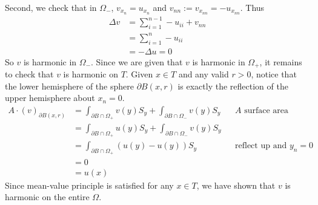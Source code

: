 \documentclass[12pt]{article}
\begin{document}
\begin{problem}[3]
\begin{problem}[5]
Second, we check that in $ \Omega_{-}$, $ v_{x_n} = u_{x_n}$ and $v_{nn}:= v_{x_{nn}} = -u_{x_{nn}}$. Thus
\begin{align*}
	\Delta v &= \sum_{ i= 1}^{ n-1} -u_{ii} + v_{nn} \\
	&= \sum_{ i= 1}^{ n} -u_{ii} \\
	&= - \Delta u = 0
\end{align*}
So $ v$ is harmonic in  $ \Omega_{-}$. Since we are given that $ v$ is harmonic in $ \Omega_{+}$, it remains to check that $ v$ is harmonic on  $ T$. Given  $ x \in T$ and any valid $ r>0$, notice that the lower hemisphere of the sphere  $ \partial B(x,r)$ is exactly the reflection of the upper hemisphere about $ x_n=0$.
 \begin{align*}
	 A \cdot  (v)_{ \partial B(x,r)} &= \int_{\partial B \cap \Omega_+} v(y) S_y + \int_{\partial B \cap \Omega_{-}} v(y) S_y && A \text{ surface area} \\
			&= \int_{\partial B \cap \Omega_+} u(y) S_y + \int_{\partial B \cap \Omega_{-}} v(y) S_y \\
			&= \int_{\partial B \cap \Omega_+} (u(y) - u(y)) S_y && \text{reflect up and }  y_n = 0\\
			&= 0 \\
			&= u(x) 
\end{align*}
Since mean-value principle is satisfied for any $ x \in T$, we have shown that $ v$ is harmonic on the entire  $ \Omega$.
\end{problem}
\end{problem}
\end{document}
